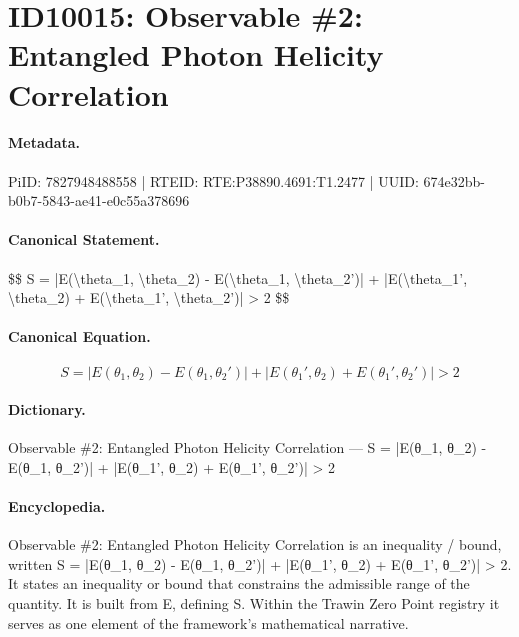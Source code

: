 \section*{ID10015: Observable \#2: Entangled Photon Helicity Correlation}
\paragraph{Metadata.}
PiID: 7827948488558 | RTEID: RTE:P38890.4691:T1.2477 | UUID: 674e32bb-b0b7-5843-ae41-e0c55a378696

\paragraph{Canonical Statement.}
\$\$ S = |E(\textbackslash{}theta\_1, \textbackslash{}theta\_2) - E(\textbackslash{}theta\_1, \textbackslash{}theta\_2')| + |E(\textbackslash{}theta\_1', \textbackslash{}theta\_2) + E(\textbackslash{}theta\_1', \textbackslash{}theta\_2')| > 2 \$\$

\paragraph{Canonical Equation.}
\[
S = |E(\theta_1, \theta_2) - E(\theta_1, \theta_2')| + |E(\theta_1', \theta_2) + E(\theta_1', \theta_2')| > 2
\]

\paragraph{Dictionary.}
Observable \#2: Entangled Photon Helicity Correlation — S = |E(θ\_1, θ\_2) - E(θ\_1, θ\_2')| + |E(θ\_1', θ\_2) + E(θ\_1', θ\_2')| > 2

\paragraph{Encyclopedia.}
Observable \#2: Entangled Photon Helicity Correlation is an inequality / bound, written S = |E(θ\_1, θ\_2) - E(θ\_1, θ\_2')| + |E(θ\_1', θ\_2) + E(θ\_1', θ\_2')| > 2. It states an inequality or bound that constrains the admissible range of the quantity. It is built from E, defining S. Within the Trawin Zero Point registry it serves as one element of the framework's mathematical narrative.
